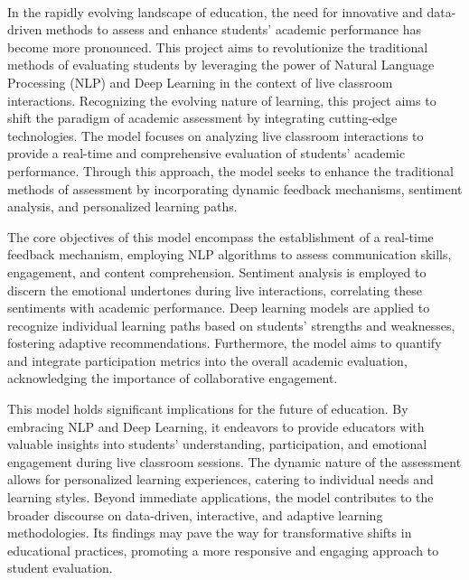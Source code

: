 \paragraph{}
 In the rapidly evolving landscape of education, the need for innovative and data-driven methods to assess and enhance students' academic performance has become more pronounced. This project aims to revolutionize the traditional methods of evaluating students by leveraging the power of Natural Language Processing (NLP) and Deep Learning in the context of live classroom interactions. Recognizing the evolving nature of learning, this project aims to shift the paradigm of academic assessment by integrating cutting-edge technologies. The model focuses on analyzing live classroom interactions to provide a real-time and comprehensive evaluation of students' academic performance. Through this approach, the model seeks to enhance the traditional methods of assessment by incorporating dynamic feedback mechanisms, sentiment analysis, and personalized learning paths. 
\par The core objectives of this model encompass the establishment of a real-time feedback mechanism, employing NLP algorithms to assess communication skills, engagement, and content comprehension. Sentiment analysis is employed to discern the emotional undertones during live interactions, correlating these sentiments with academic performance. Deep learning models are applied to recognize individual learning paths based on students' strengths and weaknesses, fostering adaptive recommendations. Furthermore, the model aims to quantify and integrate participation metrics into the overall academic evaluation, acknowledging the importance of collaborative engagement.
\par This model holds significant implications for the future of education. By embracing NLP and Deep Learning, it endeavors to provide educators with valuable insights into students' understanding, participation, and emotional engagement during live classroom sessions. The dynamic nature of the assessment allows for personalized learning experiences, catering to individual needs and learning styles. Beyond immediate applications, the model contributes to the broader discourse on data-driven, interactive, and adaptive learning methodologies. Its findings may pave the way for transformative shifts in educational practices, promoting a more responsive and engaging approach to student evaluation.



